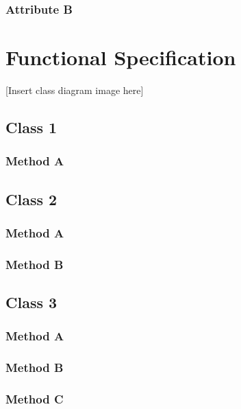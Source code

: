 \documentclass[]{article}
\begin{document}
\subsubsection{Attribute B}


\newpage
\section{Functional Specification}

[Insert class diagram image here]

\subsection{Class 1}

\subsubsection{Method A}

\subsection{Class 2}

\subsubsection{Method A}

\subsubsection{Method B}

\subsection{Class 3}

\subsubsection{Method A}

\subsubsection{Method B}

\subsubsection{Method C}

\newpage
\end{document}
